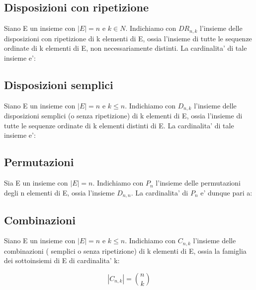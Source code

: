 \documentclass{article}
\begin{document}
\subsection{Disposizioni con ripetizione}
Siano E un insieme con $|E| = n$ e $k \in N$. Indichiamo con $DR_{n,k}$ l’insieme delle disposizioni con ripetizione di k elementi di E, ossia l’insieme di tutte le sequenze ordinate di k elementi di E, non
necessariamente distinti. La cardinalita' di tale insieme e':\newline
{}

\subsection{Disposizioni semplici}
Siano E un insieme con $|E| = n$ e $k \le n$. Indichiamo con $D_{n,k}$ l’insieme delle disposizioni semplici (o senza ripetizione) di k elementi di E, ossia l’insieme di tutte le sequenze ordinate di k elementi distinti di E. La cardinalita' di tale insieme e':\newline
{}

\subsection{Permutazioni}
Sia E un insieme con $|E| = n$. Indichiamo con $P_n$ l’insieme delle permutazioni degli n elementi di E, ossia l'insieme $D_{n,n}$. La cardinalita' di $P_n$ e' dunque pari a:\newline
{}

\subsection{Combinazioni}
Siano E un insieme con $|E| = n$ e $k \le n$. Indichiamo con $C_{n,k}$ l'insieme delle combinazioni ( semplici o senza ripetizione) di k elementi di E, ossia la famiglia dei sottoinsiemi di E di cardinalita' k:

$$ |C_{n,k}| = \binom{n}{k}$$
\end{document}

